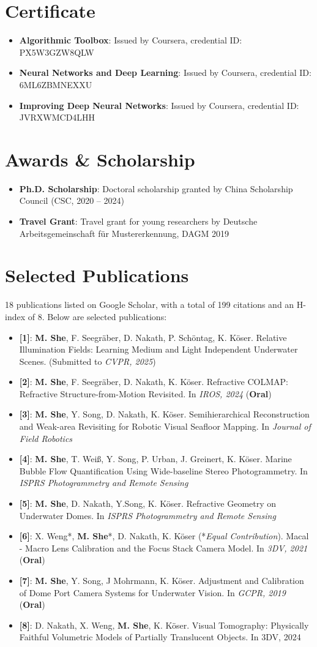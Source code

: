 \documentclass[letterpaper,11pt]{article}
\newcommand{\resumeItem}[2]{
  \item\small{
    \textbf{#1}{: #2 \vspace{-2pt}}
  }
}
\newcommand{\resumeSubHeadingListStart}{\begin{itemize}[leftmargin=*]}
\newcommand{\resumeSubHeadingListEnd}{\end{itemize}}
\begin{document}
\section{Certificate}
\resumeSubHeadingListStart
\resumeItem{Algorithmic Toolbox}{Issued by Coursera, credential ID: PX5W3GZW8QLW}
\resumeItem{Neural Networks and Deep Learning}{Issued by Coursera, credential ID: 6ML6ZBMNEXXU}
\resumeItem{Improving Deep Neural Networks}{Issued by Coursera, credential ID: JVRXWMCD4LHH}
\resumeSubHeadingListEnd

\section{Awards  \& Scholarship}
\resumeSubHeadingListStart
\resumeItem{Ph.D. Scholarship}{Doctoral scholarship granted by China Scholarship Council (CSC, 2020 -- 2024)}
\resumeItem{Travel Grant}{Travel grant for young researchers by Deutsche Arbeitsgemeinschaft f\"ur Mustererkennung, DAGM 2019}
\resumeSubHeadingListEnd

  
\section{Selected Publications}
18 publications listed on Google Scholar, with a total of 199 citations and an H-index of 8. Below are selected publications:
 \resumeSubHeadingListStart
 \resumeItem{[1]}{\textbf{M. She}, F. Seegr\"aber, D. Nakath, P. Sch\"ontag, K. K\"oser. Relative Illumination Fields: Learning Medium and Light Independent Underwater Scenes. (Submitted to \textit{CVPR, 2025})}
 \resumeItem{[2]}{\textbf{M. She}, F. Seegr\"aber, D. Nakath, K. K\"oser. Refractive COLMAP: Refractive Structure-from-Motion Revisited. In \textit{IROS, 2024} (\textbf{Oral})}
 \resumeItem{[3]}{\textbf{M. She}, Y. Song, D. Nakath, K. K\"oser. Semihierarchical Reconstruction and Weak-area Revisiting for Robotic Visual Seafloor Mapping. In \textit{Journal of Field Robotics}}
 \resumeItem{[4]}{\textbf{M. She}, T. Wei\ss, Y. Song, P. Urban, J. Greinert, K. K\"oser. Marine Bubble Flow Quantification Using Wide-baseline Stereo Photogrammetry. In \textit{ISPRS Photogrammetry and Remote Sensing}}
 \resumeItem{[5]}{\textbf{M. She}, D. Nakath, Y.Song, K. K\"oser. Refractive Geometry on Underwater Domes. In \textit{ISPRS Photogrammetry and Remote Sensing}}
 \resumeItem{[6]}{X. Weng*, \textbf{M. She}*, D. Nakath, K. K\"oser (*\textit{Equal Contribution}). Macal - Macro Lens Calibration and the Focus Stack Camera Model. In \textit{3DV, 2021} (\textbf{Oral})}
 \resumeItem{[7]}{\textbf{M. She}, Y. Song, J Mohrmann, K. K\"oser. Adjustment and Calibration of Dome Port Camera Systems for Underwater Vision. In \textit{GCPR, 2019} (\textbf{Oral})}
 \resumeItem{[8]}{D. Nakath, X. Weng, \textbf{M. She}, K. K\"oser. Visual Tomography: Physically Faithful Volumetric Models of Partially Translucent Objects. In 3DV, 2024}
 \resumeSubHeadingListEnd
\end{document}
